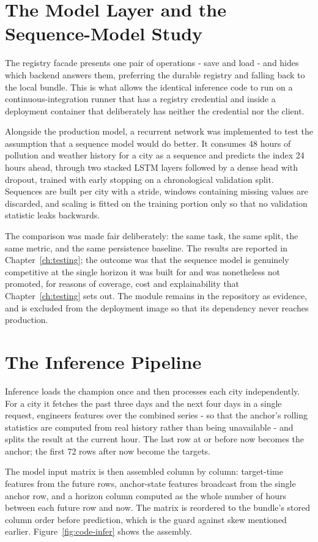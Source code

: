 \section{The Model Layer and the Sequence-Model Study}
The registry facade presents one pair of operations - save and load - and hides
which backend answers them, preferring the durable registry and falling back to
the local bundle. This is what allows the identical inference code to run on a
continuous-integration runner that has a registry credential and inside a
deployment container that deliberately has neither the credential nor the client.

Alongside the production model, a recurrent network was implemented to test the
assumption that a sequence model would do better. It consumes 48 hours of
pollution and weather history for a city as a sequence and predicts the index 24
hours ahead, through two stacked LSTM layers followed by a dense head with
dropout, trained with early stopping on a chronological validation split.
Sequences are built per city with a stride, windows containing missing values are
discarded, and scaling is fitted on the training portion only so that no
validation statistic leaks backwards.

The comparison was made fair deliberately: the same task, the same split, the same
metric, and the same persistence baseline. The results are reported in
Chapter~\ref{ch:testing}; the outcome was that the sequence model is genuinely
competitive at the single horizon it was built for and was nonetheless not
promoted, for reasons of coverage, cost and explainability that
Chapter~\ref{ch:testing} sets out. The module remains in the repository as
evidence, and is excluded from the deployment image so that its dependency never
reaches production.

\section{The Inference Pipeline}
\label{sec:impl-inference}
Inference loads the champion once and then processes each city independently. For
a city it fetches the past three days and the next four days in a single request,
engineers features over the combined series - so that the anchor's rolling
statistics are computed from real history rather than being unavailable - and
splits the result at the current hour. The last row at or before now becomes the
anchor; the first 72 rows after now become the targets.

The model input matrix is then assembled column by column: target-time features
from the future rows, anchor-state features broadcast from the single anchor row,
and a horizon column computed as the whole number of hours between each future row
and now. The matrix is reordered to the bundle's stored column order before
prediction, which is the guard against skew mentioned earlier.
Figure~\ref{fig:code-infer} shows the assembly.

